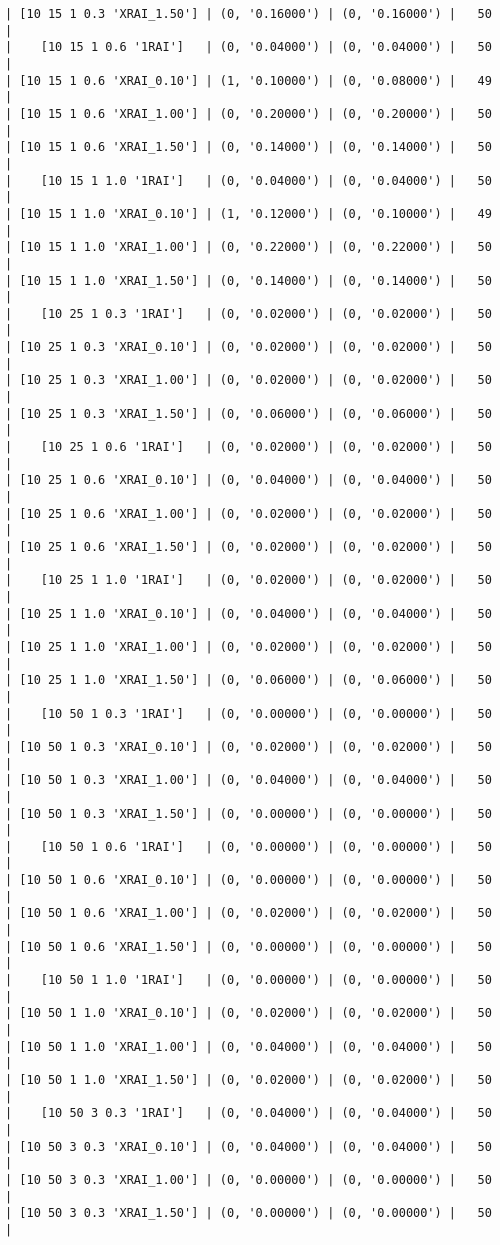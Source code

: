 \documentclass{article}
\begin{document}
\begin{verbatim}
| [10 15 1 0.3 'XRAI_1.50'] | (0, '0.16000') | (0, '0.16000') |   50  |
|    [10 15 1 0.6 '1RAI']   | (0, '0.04000') | (0, '0.04000') |   50  |
| [10 15 1 0.6 'XRAI_0.10'] | (1, '0.10000') | (0, '0.08000') |   49  |
| [10 15 1 0.6 'XRAI_1.00'] | (0, '0.20000') | (0, '0.20000') |   50  |
| [10 15 1 0.6 'XRAI_1.50'] | (0, '0.14000') | (0, '0.14000') |   50  |
|    [10 15 1 1.0 '1RAI']   | (0, '0.04000') | (0, '0.04000') |   50  |
| [10 15 1 1.0 'XRAI_0.10'] | (1, '0.12000') | (0, '0.10000') |   49  |
| [10 15 1 1.0 'XRAI_1.00'] | (0, '0.22000') | (0, '0.22000') |   50  |
| [10 15 1 1.0 'XRAI_1.50'] | (0, '0.14000') | (0, '0.14000') |   50  |
|    [10 25 1 0.3 '1RAI']   | (0, '0.02000') | (0, '0.02000') |   50  |
| [10 25 1 0.3 'XRAI_0.10'] | (0, '0.02000') | (0, '0.02000') |   50  |
| [10 25 1 0.3 'XRAI_1.00'] | (0, '0.02000') | (0, '0.02000') |   50  |
| [10 25 1 0.3 'XRAI_1.50'] | (0, '0.06000') | (0, '0.06000') |   50  |
|    [10 25 1 0.6 '1RAI']   | (0, '0.02000') | (0, '0.02000') |   50  |
| [10 25 1 0.6 'XRAI_0.10'] | (0, '0.04000') | (0, '0.04000') |   50  |
| [10 25 1 0.6 'XRAI_1.00'] | (0, '0.02000') | (0, '0.02000') |   50  |
| [10 25 1 0.6 'XRAI_1.50'] | (0, '0.02000') | (0, '0.02000') |   50  |
|    [10 25 1 1.0 '1RAI']   | (0, '0.02000') | (0, '0.02000') |   50  |
| [10 25 1 1.0 'XRAI_0.10'] | (0, '0.04000') | (0, '0.04000') |   50  |
| [10 25 1 1.0 'XRAI_1.00'] | (0, '0.02000') | (0, '0.02000') |   50  |
| [10 25 1 1.0 'XRAI_1.50'] | (0, '0.06000') | (0, '0.06000') |   50  |
|    [10 50 1 0.3 '1RAI']   | (0, '0.00000') | (0, '0.00000') |   50  |
| [10 50 1 0.3 'XRAI_0.10'] | (0, '0.02000') | (0, '0.02000') |   50  |
| [10 50 1 0.3 'XRAI_1.00'] | (0, '0.04000') | (0, '0.04000') |   50  |
| [10 50 1 0.3 'XRAI_1.50'] | (0, '0.00000') | (0, '0.00000') |   50  |
|    [10 50 1 0.6 '1RAI']   | (0, '0.00000') | (0, '0.00000') |   50  |
| [10 50 1 0.6 'XRAI_0.10'] | (0, '0.00000') | (0, '0.00000') |   50  |
| [10 50 1 0.6 'XRAI_1.00'] | (0, '0.02000') | (0, '0.02000') |   50  |
| [10 50 1 0.6 'XRAI_1.50'] | (0, '0.00000') | (0, '0.00000') |   50  |
|    [10 50 1 1.0 '1RAI']   | (0, '0.00000') | (0, '0.00000') |   50  |
| [10 50 1 1.0 'XRAI_0.10'] | (0, '0.02000') | (0, '0.02000') |   50  |
| [10 50 1 1.0 'XRAI_1.00'] | (0, '0.04000') | (0, '0.04000') |   50  |
| [10 50 1 1.0 'XRAI_1.50'] | (0, '0.02000') | (0, '0.02000') |   50  |
|    [10 50 3 0.3 '1RAI']   | (0, '0.04000') | (0, '0.04000') |   50  |
| [10 50 3 0.3 'XRAI_0.10'] | (0, '0.04000') | (0, '0.04000') |   50  |
| [10 50 3 0.3 'XRAI_1.00'] | (0, '0.00000') | (0, '0.00000') |   50  |
| [10 50 3 0.3 'XRAI_1.50'] | (0, '0.00000') | (0, '0.00000') |   50  |

\end{verbatim}
\end{document}
